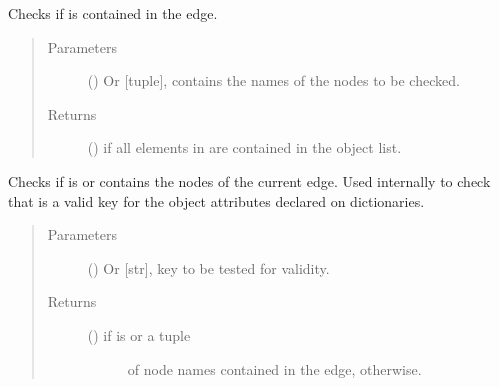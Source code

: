 \documentclass[letterpaper,10pt,english]{sphinxmanual}
\begin{document}
\begin{fulllineitems}
\begin{fulllineitems}
\label{\detokenize{reference:pypath.main.Direction.check_nodes}}
Checks if  is contained in the edge.
\begin{quote}\begin{description}
\item[{Parameters}] \leavevmode
{} () \textendash{} Or {[}tuple{]}, contains the names of the nodes to be checked.

\item[{Returns}] \leavevmode
() \textendash{}  if all elements in  are
contained in the object  list.

\end{description}\end{quote}

\end{fulllineitems}


\begin{fulllineitems}
\label{\detokenize{reference:pypath.main.Direction.check_param}}
Checks if  is  or contains the nodes of
the current edge. Used internally to check that  is a valid
key for the object attributes declared on dictionaries.
\begin{quote}\begin{description}
\item[{Parameters}] \leavevmode
{} () \textendash{} Or {[}str{]}, key to be tested for validity.

\item[{Returns}] \leavevmode
\begin{description}
\item[{() \textendash{}  if  is  or a tuple}] \leavevmode
of node names contained in the edge,  otherwise.


\end{description}
\end{description}
\end{quote}
\end{fulllineitems}
\end{fulllineitems}
\end{document}
